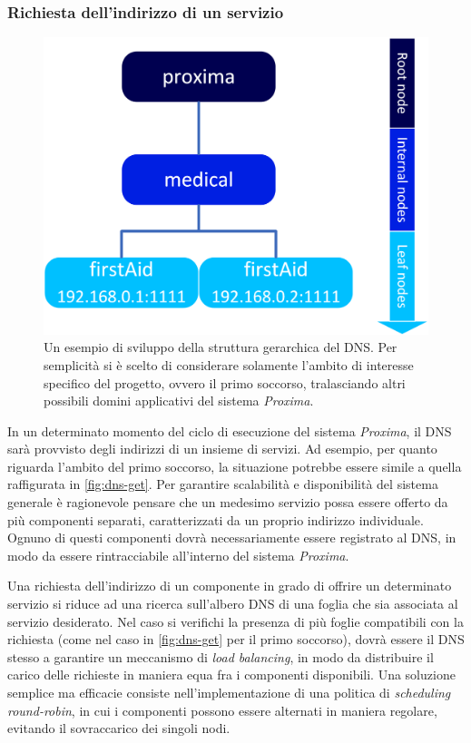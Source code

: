 \documentclass[a4paper,12pt]{report}
\begin{document}
\subsubsection{Richiesta dell'indirizzo di un servizio}
\begin{figure}[H]
	\centering
	\includegraphics[scale=0.7]{./img/dns-get.png}
	\caption{Un esempio di sviluppo della struttura gerarchica del DNS. Per semplicità si è scelto di considerare solamente l'ambito di interesse specifico del progetto, ovvero il primo soccorso, tralasciando altri possibili domini applicativi del sistema \emph{Proxima}.}
	\label{fig:dns-get}
\end{figure}
In un determinato momento del ciclo di esecuzione del sistema \emph{Proxima}, il DNS sarà provvisto degli indirizzi di un insieme di servizi. Ad esempio, per quanto riguarda l'ambito del primo soccorso, la situazione potrebbe essere simile a quella raffigurata in \autoref{fig:dns-get}. Per garantire scalabilità e disponibilità del sistema generale è ragionevole pensare che un medesimo servizio possa essere offerto da più componenti separati, caratterizzati da un proprio indirizzo individuale. Ognuno di questi componenti dovrà necessariamente essere registrato al DNS, in modo da essere rintracciabile all'interno del sistema \emph{Proxima}. 

Una richiesta dell'indirizzo di un componente in grado di offrire un determinato servizio si riduce ad una ricerca sull'albero DNS di una foglia che sia associata al servizio desiderato. Nel caso si verifichi la presenza di più foglie compatibili con la richiesta (come nel caso in \autoref{fig:dns-get} per il primo soccorso), dovrà essere il DNS stesso a garantire un meccanismo di \emph{load balancing}, in modo da distribuire il carico delle richieste in maniera equa fra i componenti disponibili. Una soluzione semplice ma efficacie consiste nell'implementazione di una politica di \emph{scheduling round-robin}, in cui i componenti possono essere alternati in maniera regolare, evitando il sovraccarico dei singoli nodi.
\end{document}

